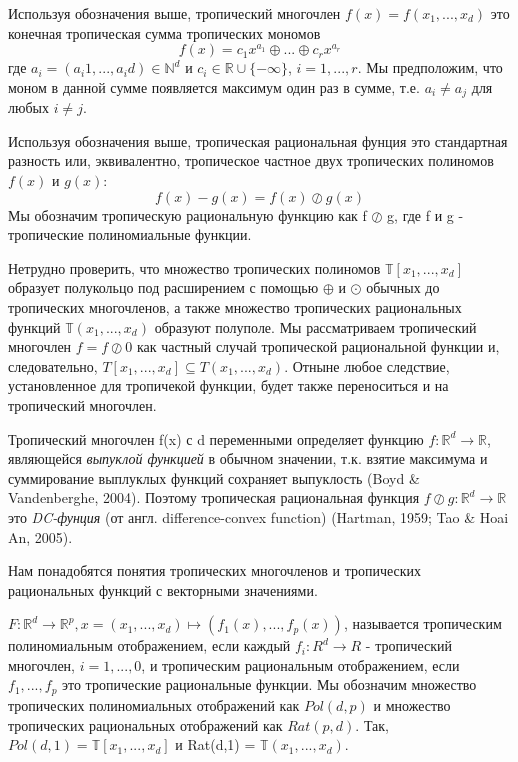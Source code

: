 \documentclass[russian]{lecture-notes}
\begin{document}
	\begin{Definition}
		Используя обозначения выше, тропический многочлен $f(x) = f(x_1,...,x_d)$ это конечная тропическая сумма тропических мономов
		\begin{equation*}
		f(x) = {c_1} x^{a_1} \oplus ... \oplus {c_r}x^{a_r}
		\end{equation*}
		где $a_i = (a_i1,...,a_id) \in \mathbb{N}^d$ и $c_i \in \mathbb{R} \cup \{- \infty\}$, $i=1,...,r$. Мы предположим, что моном в данной сумме появляется максимум один раз в сумме, т.е. $a_i \ne a_j$ для любых $i \ne j$. 
	\end{Definition}
	
	\begin{Definition}
		Используя обозначения выше, тропическая рациональная фунция это стандартная разность или, эквивалентно, тропическое частное двух тропических полиномов $f(x)$ и $g(x)$:
		\begin{equation*}
		f(x) - g(x) = f(x) \oslash g(x)
		\end{equation*}
		Мы обозначим тропическую рациональную функцию как f $\oslash$ g, где f и g - тропические полиномиальные функции.
	\end{Definition}
	
	Нетрудно проверить, что множество тропических полиномов $\mathbb{T}[x_1,...,x_d]$ образует полукольцо под расширением с помощью $\oplus$ и $\odot$ обычных до тропических многочленов, а также множество тропических рациональных функций $\mathbb{T}(x_1,...,x_d)$ образуют полуполе. Мы рассматриваем тропический многочлен $f = f \oslash 0$ как частный случай тропической рациональной функции и, следовательно, $T[x_1,...,x_d] \subseteq T(x_1,...,x_d)$. Отныне любое следствие, установленное для тропичекой функции, будет также переноситься и на тропический многочлен.
	
	Тропический многочлен f(x) с d переменными определяет функцию $f: \mathbb{R}^d \to \mathbb{R}$, являющейся \textit{выпуклой функцией} в обычном значении, т.к. взятие максимума и суммирование выплуклых функций сохраняет выпуклость (Boyd \& Vandenberghe, 2004). Поэтому тропическая рациональная функция $f \oslash g : \mathbb{R}^d \to \mathbb{R}$ это \textit{DC-фунция} (от англ. difference-convex function) (Hartman, 1959; Tao \& Hoai An, 2005).
	
	Нам понадобятся понятия тропических многочленов и тропических рациональных функций с векторными значениями.
	
	\begin{Definition}
		$ F : \mathbb{R}^d \to \mathbb{R}^p, x = (x_1,...,x_d) \mapsto (f_1(x),...,f_p(x))$, называется тропическим полиномиальным отображением, если каждый $f_i: R^d \to R$ - тропический многочлен, $i = 1,...,0$, и тропическим рациональным отображением, если $f_1,...,f_p$ это тропические рациональные функции. Мы обозначим множество тропических полиномиальных отображений как $Pol(d, p)$ и множество тропических рациональных отображений как $Rat(p, d)$. Так, $Pol(d,1) = \mathbb{T}[x_1,...,x_d]$ и Rat(d,1) = $\mathbb{T}(x_1,...,x_d)$.
	\end{Definition} 
	
\end{document}
